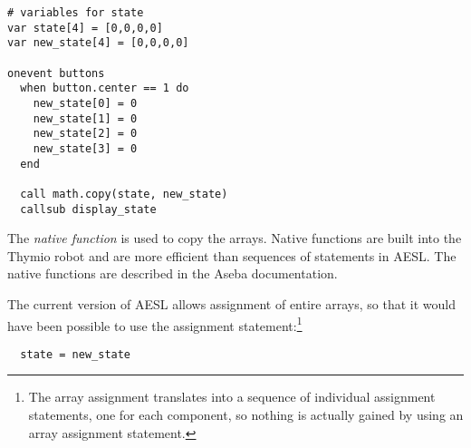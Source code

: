 \begin{footnotesize}
\begin{verbatim}
# variables for state
var state[4] = [0,0,0,0]
var new_state[4] = [0,0,0,0]

onevent buttons
  when button.center == 1 do
    new_state[0] = 0
    new_state[1] = 0
    new_state[2] = 0
    new_state[3] = 0
  end

  call math.copy(state, new_state)
  callsub display_state
\end{verbatim}
\end{footnotesize}

The \emph{native function}  is used to copy the arrays.
Native functions are built into the Thymio robot and are more efficient
than sequences of statements in AESL. The native functions are described
in the Aseba documentation.

The current version of AESL allows assignment of entire arrays, so that
it would have been possible to use the assignment
statement:\footnote{The array assignment translates into a sequence of
individual assignment statements, one for each component, so nothing is
actually gained by using an array assignment statement.}

\begin{footnotesize}
\begin{verbatim}
  state = new_state
\end{verbatim}
\end{footnotesize}
